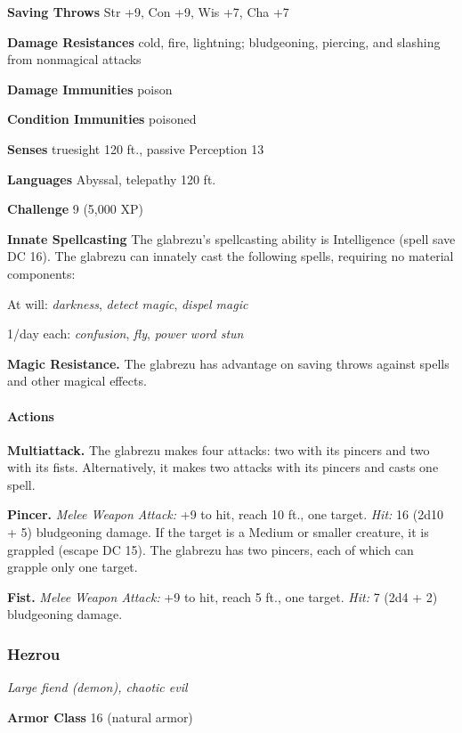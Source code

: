 \documentclass[
]{article}
\begin{document}
\textbf{Saving Throws} Str +9, Con +9, Wis +7, Cha +7

\textbf{Damage Resistances} cold, fire, lightning; bludgeoning,
piercing, and slashing from nonmagical attacks

\textbf{Damage Immunities} poison

\textbf{Condition Immunities} poisoned

\textbf{Senses} truesight 120 ft., passive Perception 13

\textbf{Languages} Abyssal, telepathy 120 ft.

\textbf{Challenge} 9 (5,000 XP)

\textbf{Innate Spellcasting} The glabrezu's spellcasting ability is
Intelligence (spell save DC 16). The glabrezu can innately cast the
following spells, requiring no material components:

At will: \emph{darkness}, \emph{detect magic}, \emph{dispel magic}

1/day each: \emph{confusion}, \emph{fly}, \emph{power word stun}

\textbf{Magic Resistance.} The glabrezu has advantage on saving throws
against spells and other magical effects.

\hypertarget{actions-3}{%
\paragraph{Actions}\label{actions-3}}

\textbf{Multiattack.} The glabrezu makes four attacks: two with its
pincers and two with its fists. Alternatively, it makes two attacks with
its pincers and casts one spell.

\textbf{Pincer.} \emph{Melee Weapon Attack:} +9 to hit, reach 10 ft.,
one target. \emph{Hit:} 16 (2d10 + 5) bludgeoning damage. If the target
is a Medium or smaller creature, it is grappled (escape DC 15). The
glabrezu has two pincers, each of which can grapple only one target.

\textbf{Fist.} \emph{Melee Weapon Attack:} +9 to hit, reach 5 ft., one
target. \emph{Hit:} 7 (2d4 + 2) bludgeoning damage.

\hypertarget{hezrou}{%
\subsubsection{Hezrou}\label{hezrou}}

\emph{Large fiend (demon), chaotic evil}

\textbf{Armor Class} 16 (natural armor)
\end{document}
